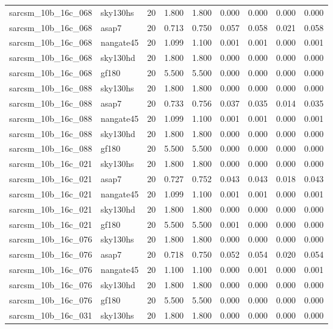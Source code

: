 \begin{tabular}{llrrrrrrr}
sarcsm\_10b\_16c\_068 & sky130hs & 20 & 1.800 & 1.800 & 0.000 & 0.000 & 0.000 & 0.000 \\
sarcsm\_10b\_16c\_068 & asap7 & 20 & 0.713 & 0.750 & 0.057 & 0.058 & 0.021 & 0.058 \\
sarcsm\_10b\_16c\_068 & nangate45 & 20 & 1.099 & 1.100 & 0.001 & 0.001 & 0.000 & 0.001 \\
sarcsm\_10b\_16c\_068 & sky130hd & 20 & 1.800 & 1.800 & 0.000 & 0.000 & 0.000 & 0.000 \\
sarcsm\_10b\_16c\_068 & gf180 & 20 & 5.500 & 5.500 & 0.000 & 0.000 & 0.000 & 0.000 \\
sarcsm\_10b\_16c\_088 & sky130hs & 20 & 1.800 & 1.800 & 0.000 & 0.000 & 0.000 & 0.000 \\
sarcsm\_10b\_16c\_088 & asap7 & 20 & 0.733 & 0.756 & 0.037 & 0.035 & 0.014 & 0.035 \\
sarcsm\_10b\_16c\_088 & nangate45 & 20 & 1.099 & 1.100 & 0.001 & 0.001 & 0.000 & 0.001 \\
sarcsm\_10b\_16c\_088 & sky130hd & 20 & 1.800 & 1.800 & 0.000 & 0.000 & 0.000 & 0.000 \\
sarcsm\_10b\_16c\_088 & gf180 & 20 & 5.500 & 5.500 & 0.000 & 0.000 & 0.000 & 0.000 \\
sarcsm\_10b\_16c\_021 & sky130hs & 20 & 1.800 & 1.800 & 0.000 & 0.000 & 0.000 & 0.000 \\
sarcsm\_10b\_16c\_021 & asap7 & 20 & 0.727 & 0.752 & 0.043 & 0.043 & 0.018 & 0.043 \\
sarcsm\_10b\_16c\_021 & nangate45 & 20 & 1.099 & 1.100 & 0.001 & 0.001 & 0.000 & 0.001 \\
sarcsm\_10b\_16c\_021 & sky130hd & 20 & 1.800 & 1.800 & 0.000 & 0.000 & 0.000 & 0.000 \\
sarcsm\_10b\_16c\_021 & gf180 & 20 & 5.500 & 5.500 & 0.001 & 0.000 & 0.000 & 0.000 \\
sarcsm\_10b\_16c\_076 & sky130hs & 20 & 1.800 & 1.800 & 0.000 & 0.000 & 0.000 & 0.000 \\
sarcsm\_10b\_16c\_076 & asap7 & 20 & 0.718 & 0.750 & 0.052 & 0.054 & 0.020 & 0.054 \\
sarcsm\_10b\_16c\_076 & nangate45 & 20 & 1.100 & 1.100 & 0.000 & 0.001 & 0.000 & 0.001 \\
sarcsm\_10b\_16c\_076 & sky130hd & 20 & 1.800 & 1.800 & 0.000 & 0.000 & 0.000 & 0.000 \\
sarcsm\_10b\_16c\_076 & gf180 & 20 & 5.500 & 5.500 & 0.000 & 0.000 & 0.000 & 0.000 \\
sarcsm\_10b\_16c\_031 & sky130hs & 20 & 1.800 & 1.800 & 0.000 & 0.000 & 0.000 & 0.000 \\

\end{tabular}
